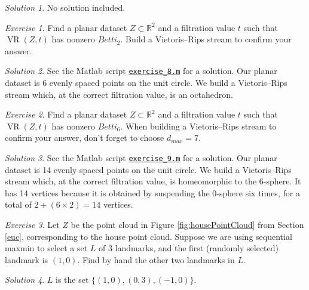 \documentclass[amscd, amssymb, verbatim]{amsart}[12pt]
\theoremstyle{remark}
\theoremstyle{remark}
\newtheorem{exerciseSol}{Exercise}
\theoremstyle{remark}
\newtheorem*{solution}{Solution}
\DeclareMathOperator{\VR}{VR}
\begin{document}
\begin{solution}
No solution included. 
\end{solution}

\begin{exerciseSol}
Find a planar dataset $Z \subset \mathbb{R}^2$ and a filtration value $t$ such that $\VR(Z,t)$ has nonzero $Betti_2$. Build a Vietoris--Rips stream to confirm your answer.
\end{exerciseSol}

\begin{solution}
See the Matlab script \href{https://github.com/appliedtopology/javaplex/tree/master/src/matlab/for_distribution/tutorial_solutions/exercise_8.m}{\texttt{exercise\_8.m}} for a solution. Our planar dataset is 6 evenly spaced points on the unit circle. We build a Vietoris--Rips stream which, at the correct filtration value, is an octahedron. 
\end{solution}

\begin{exerciseSol}
Find a planar dataset $Z \subset \mathbb{R}^2$ and a filtration value $t$ such that $\VR(Z,t)$ has nonzero $Betti_6$. When building a Vietoris--Rips stream to confirm your answer, don't forget to choose $d_{max} = 7$.
\end{exerciseSol}

\begin{solution}
See the Matlab script \href{https://github.com/appliedtopology/javaplex/tree/master/src/matlab/for_distribution/tutorial_solutions/exercise_9.m}{\texttt{exercise\_9.m}} for a solution. Our planar dataset is 14 evenly spaced points on the unit circle. We build a Vietoris--Rips stream which, at the correct filtration value, is homeomorphic to the 6-sphere. It has 14 vertices because it is obtained by suspending the 0-sphere six times, for a total of $2 + (6 \times 2) = 14$ vertices. 
\end{solution}

\begin{exerciseSol}
Let $Z$ be the point cloud in Figure \ref{fig:housePointCloud} from Section \ref{euc}, corresponding to the house point cloud. Suppose we are using sequential maxmin to select a set $L$ of 3 landmarks, and the first (randomly selected) landmark is $(1,0)$. Find by hand the other two landmarks in $L$.
\end{exerciseSol}

\begin{solution}
$L$ is the set $\{(1, 0), (0, 3), (-1, 0)\}$. 
\end{solution}
\end{document}
